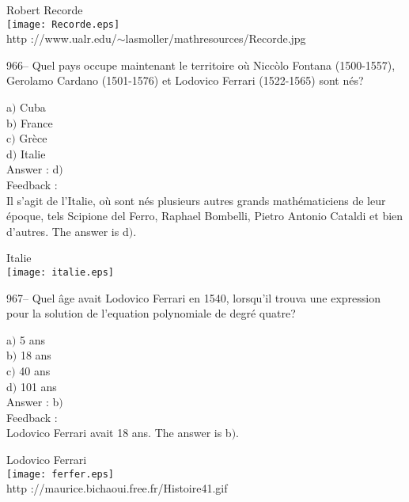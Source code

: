 ﻿\documentclass[letterpaper, 12pt]{article}
\begin{document}
        \begin{center}
        Robert Recorde\\
    \texttt{[image: Recorde.eps]}\\
        {\footnotesize http
://www.ualr.edu/$\sim$lasmoller/mathresources/Recorde.jpg}
    \end{center}

966-- Quel pays occupe maintenant le territoire o\`u Nicc\`olo
Fontana (1500-1557), Gerolamo Cardano (1501-1576) et Lodovico
Ferrari (1522-1565) sont n\'es?

a$)$ Cuba \\
b$)$ France  \\
c$)$ Gr\`ece \\
d$)$ Italie \\

Answer : d$)$\\

Feedback : \\
Il s'agit de l'Italie, o\`u sont n\'es plusieurs autres grands
math\'ematiciens de leur \'epoque, tels Scipione del Ferro, Raphael
Bombelli, Pietro Antonio Cataldi et bien d'autres. The answer is
d$)$.

        \begin{center}
        Italie\\
    \texttt{[image: italie.eps]}\\
    \end{center}

967-- Quel \^age avait Lodovico Ferrari en 1540, lorsqu'il trouva
une expression pour la solution de l'equation polynomiale de
degr\'e quatre?

a$)$ 5 ans \\
b$)$ 18 ans  \\
c$)$ 40 ans \\
d$)$ 101 ans \\

Answer : b$)$\\

Feedback : \\
Lodovico Ferrari avait 18 ans. The answer is b$)$.\\

        \begin{center}
        Lodovico Ferrari\\
    \texttt{[image: ferfer.eps]}\\
        {\footnotesize http ://maurice.bichaoui.free.fr/Histoire41.gif}
    \end{center}
\end{document}

